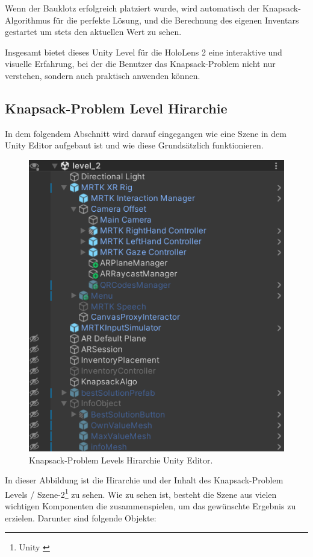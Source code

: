 Wenn der Bauklotz erfolgreich platziert wurde, wird automatisch der Knapsack-Algorithmus für die perfekte Lösung,
und die Berechnung des eigenen Inventars gestartet um stets den aktuellen Wert zu sehen.

Insgesamt bietet dieses Unity Level für die HoloLens 2 eine interaktive und visuelle Erfahrung,
bei der die Benutzer das Knapsack-Problem nicht nur verstehen, sondern auch praktisch anwenden können.

\subsection{Knapsack-Problem Level Hirarchie}
In dem folgendem Abschnitt wird darauf eingegangen wie eine Szene in dem Unity Editor aufgebaut ist und wie diese Grundsätzlich
funktionieren.\\

\begin{figure}[h]
    \centering
    \includegraphics[scale=0.8]{images/Level2Hirarchy}
    \caption{Knapsack-Problem Levels Hirarchie Unity Editor.}
    \label{fig:level2_hierarchy}
\end{figure}

In dieser Abbildung ist die Hirarchie und der Inhalt des Knapsack-Problem Levels / Szene-2\footnote{Unity \cite{Scene}} zu sehen.
Wie zu sehen ist, besteht die Szene aus vielen wichtigen Komponenten die zusammenspielen, um das gewünschte Ergebnis
zu erzielen. Darunter sind folgende Objekte:

